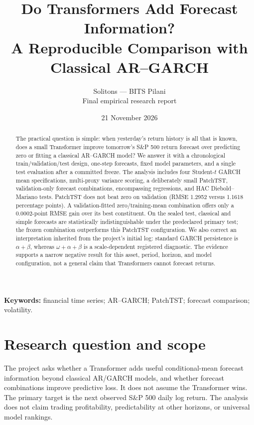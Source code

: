 \documentclass[11pt,a4paper]{article}
\title{Do Transformers Add Forecast Information?\\A Reproducible Comparison with Classical AR--GARCH}
\author{Solitons --- BITS Pilani\\\small Final empirical research report}
\date{21 November 2026}
\begin{document}
\maketitle
\begin{abstract}
The practical question is simple: when yesterday's return history is all that is known, does a
small Transformer improve tomorrow's S\&P 500 return forecast over predicting zero or fitting a
classical AR--GARCH model? We answer it with a chronological train/validation/test design,
one-step forecasts, fixed model parameters, and a single test evaluation after a committed
freeze. The analysis includes four Student-$t$ GARCH mean specifications, multi-proxy variance
scoring, a deliberately small PatchTST, validation-only forecast combinations, encompassing
regressions, and HAC Diebold--Mariano tests. PatchTST does not beat zero on validation (RMSE
1.2952 versus 1.1618 percentage points). A validation-fitted zero/training-mean combination
offers only a 0.0002-point RMSE gain over its best constituent. On the sealed test, classical
and simple forecasts are statistically indistinguishable under the predeclared primary test;
the frozen combination outperforms this PatchTST configuration. We also correct an
interpretation inherited from the project's initial log: standard GARCH persistence is
$\alpha+\beta$, whereas $\omega+\alpha+\beta$ is a scale-dependent registered diagnostic.
The evidence supports a narrow negative result for this asset, period, horizon, and model
configuration, not a general claim that Transformers cannot forecast returns.
\end{abstract}
\noindent\textbf{Keywords:} financial time series; AR--GARCH; PatchTST; forecast comparison;
volatility.
\tableofcontents
\newpage

\section{Research question and scope}
The project asks whether a Transformer adds useful conditional-mean forecast information beyond
classical AR/GARCH models, and whether forecast combinations improve predictive loss. It does not
assume the Transformer wins. The primary target is the next observed S\&P 500 daily log return.
The analysis does not claim trading profitability, predictability at other horizons, or universal
model rankings.
\end{document}
